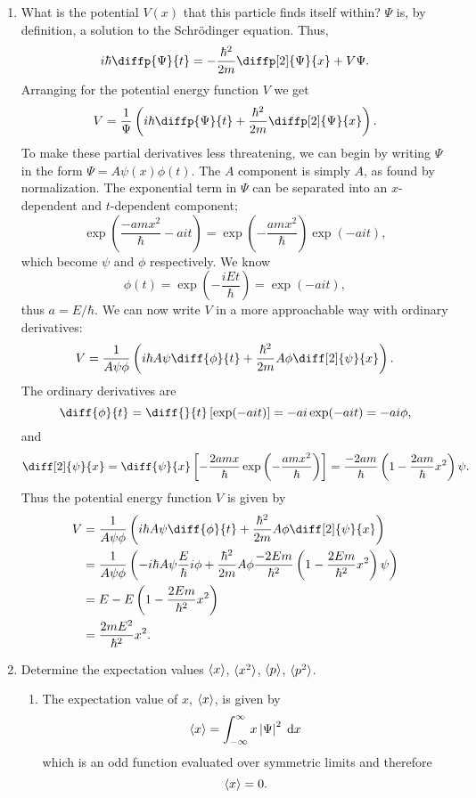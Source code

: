 \documentclass[a4paper, 12pt]{config/homework}
\begin{document}
\begin{enumerate}
\begin{enumerate}[label = (\alph*)]
\pagebreak
\item What is the potential \(V(x)\) that this particle finds itself within?
\(\Psi \) is, by definition, a solution to the Schr{\"o}dinger equation. Thus,
\[i\hbar \diffp{\Psi}{t} = -\frac{\hbar^2}{2m} \diffp[2]{\Psi}{x} + V\Psi.\]
Arranging for the potential energy function \(V\) we get
\[V = \frac{1}{\Psi} \left(i\hbar \diffp{\Psi}{t} + \frac{\hbar^2}{2m} \diffp[2]{\Psi}{x}\right).\]
To make these partial derivatives less threatening, we can begin by writing \(\Psi \) in the form \(\Psi = A \psi(x) \phi(t)\).
The \(A\) component is simply \(A\), as found by normalization.
The exponential term in \(\Psi \) can be separated into an \(x\)-dependent and \(t\)-dependent component;
\[\exp\left(\frac{-amx^2}{\hbar} - ait\right) = \exp\left(-\frac{amx^2}{\hbar}\right)\exp\left(-ait\right),\]
which become \(\psi \) and \(\phi \) respectively. We know
\[\phi(t) = \exp\left(-\frac{iEt}{\hbar}\right) = \exp\left(-ait\right),\]
thus \(a = E / \hbar \). We can now write \(V\) in a more approachable way with ordinary derivatives:
\[V = \frac{1}{A\psi\phi} \left(i\hbar A\psi \diff{\phi}{t} + \frac{\hbar^2}{2m} A\phi \diff[2]{\psi}{x}\right).\]
The ordinary derivatives are
\[\diff{\phi}{t} = \diff{}{t}\left[\exp(-ait)\right] = -ai \exp(-ait) = -ai \phi,\]
and
\[\diff[2]{\psi}{x} =
\diff{\psi}{x}\left[-\frac{2amx}{\hbar} \exp\left(-\frac{amx^2}{\hbar}\right)\right] =
\frac{-2am}{\hbar}\left(1 - \frac{2am}{\hbar}x^2\right)\psi.
\]
Thus the potential energy function \(V\) is given by
\begin{align*}
V &= \frac{1}{A\psi\phi} \left(i\hbar A\psi \diff{\phi}{t} + \frac{\hbar^2}{2m} A\phi \diff[2]{\psi}{x}\right)
\\&= \frac{1}{A\psi\phi} \left(-i\hbar A\psi  \frac{E}{\hbar} i \phi + \frac{\hbar^2}{2m} A\phi \frac{-2Em}{\hbar^2}\left(1 - \frac{2Em}{\hbar^2}x^2\right)\psi\right)
\\&= E - E\left(1 - \frac{2Em}{\hbar^2}x^2\right)
\\&= \frac{2 m E^2 }{\hbar^2} x^2.
\end{align*}

\pagebreak
\item Determine the expectation values \(\braket{x}\), \(\braket{x^2}\), \(\braket{p}\), \(\braket{p^2}\).
\begin{enumerate}[label=\roman*.]

\item The expectation value of \(x\), \(\braket{x}\), is given by
\[\braket{x} = \bint{-\infty}{\infty}{x \left|\Psi\right|^2}{x}\]
which is an odd function evaluated over symmetric limits and therefore
\[\braket{x} = 0.\]


\end{enumerate}
\end{enumerate}
\end{enumerate}
\end{document}
